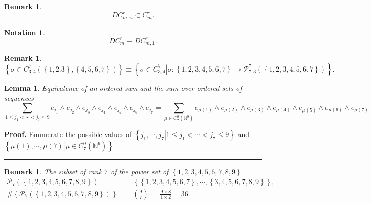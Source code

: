 \documentclass[aps,preprint]{revtex4}%
\newtheorem{lemma}[theorem]{Lemma}
\newtheorem{notation}[theorem]{Notation}
\newtheorem{remark}[theorem]{Remark}
\newenvironment{proof}[1][Proof]{\noindent\textbf{#1.} }{\ \rule{0.5em}{0.5em}}
\begin{document}
\begin{remark}%
\begin{equation}
DC_{m,n}^{r}\subset C_{m}^{r}.
\end{equation}

\end{remark}

\begin{notation}%
\begin{equation}
DC_{m}^{r}\equiv DC_{m,1}^{r}.
\end{equation}

\end{notation}

\begin{remark}%
\begin{equation}
\left\{  \sigma\in C_{3,4}^{7}\left(  \left\{  1,2.3\right\}  ,\left\{
4,5,6,7\right\}  \right)  \right\}  \equiv\left\{  \left.  \sigma\in
C_{3,4}^{7}\right\vert \sigma:\left\{  1,2,3,4,5,6,7\right\}  \rightarrow
\mathcal{P}_{7,3}^{7}\left(  \left\{  1,2,3,4,5,6,7\right\}  \right)
\right\}  .
\end{equation}

\end{remark}

\begin{lemma}
Equivalence of an ordered sum and the sum over ordered sets of sequences
\begin{equation}
\sum_{1\leq j_{1}<\cdots<j_{7}\leq9}e_{j_{1}}\wedge e_{j_{2}}\wedge e_{j_{3}%
}\wedge e_{j_{4}}\wedge e_{j_{5}}\wedge e_{j_{6}}\wedge e_{j_{7}}=\sum_{\mu\in
C_{7}^{9}\left(  \mathbb{N}^{9}\right)  }e_{\mu\left(  1\right)  }\wedge
e_{\mu\left(  2\right)  }\wedge e_{\mu\left(  3\right)  }\wedge e_{\mu\left(
4\right)  }\wedge e_{\mu\left(  5\right)  }\wedge e_{\mu\left(  6\right)
}\wedge e_{\mu\left(  7\right)  }%
\end{equation}

\end{lemma}

\begin{proof}
Enumerate the possible values of $\left\{  j_{1},\cdots,j_{7}\left\vert 1\leq
j_{1}<\cdots<j_{7}\leq9\right.  \right\}  $ and $\left\{  \mu\left(  1\right)
,\cdots,\mu\left(  7\right)  \left\vert \mu\in C_{7}^{9}\left(  \mathbb{N}%
^{9}\right)  \right.  \right\}  $
\end{proof}

\begin{remark}
The subset of rank $7$ of the power set of $\left\{
1,2,3,4,5,6,7,8,9\right\}  $
\begin{align}
\mathcal{P}_{7}\left(  \left\{  1,2,3,4,5,6,7,8,9\right\}  \right)   &
=\left\{  \left\{  1,2,3,4,5,6,7\right\}  ,\cdots,\left\{
3,4,5,6,7,8,9\right\}  \right\}  ,\\
\#\left\{  \mathcal{P}_{7}\left(  \left\{  1,2,3,4,5,6,7,8,9\right\}  \right)
\right\}   &  =\binom{9}{7}=\ \frac{9\times8}{1\times2}=36.
\end{align}

\end{remark}
\end{document}
